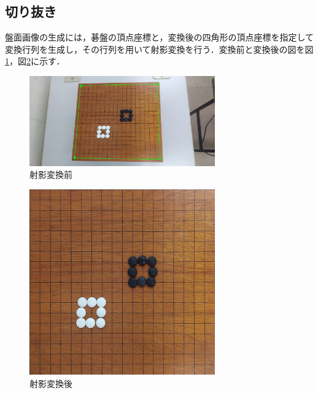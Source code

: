 \documentclass[openright]{nitocs}
\numberwithin{equation}{section}
\begin{document}
        \subsection{切り抜き}
            盤面画像の生成には，碁盤の頂点座標と，変換後の四角形の頂点座標を指定して変換行列を生成し，その行列を用いて射影変換を行う．変換前と変換後の図を図\ref{cornerImg}，図\ref{boardImg}に示す．
            \begin{figure}[tb] %
                \begin{center}
                \includegraphics[clip,width=80mm]{cornerImg.jpg} 
                \caption{射影変換前}
                \label{cornerImg}
                \end{center}
            \end{figure}
            \begin{figure}[tb] %
                \begin{center}
                \includegraphics[clip,width=80mm]{boardImg.jpg} 
                \caption{射影変換後}
                \label{boardImg}
                \end{center}
            \end{figure}
\end{document}

